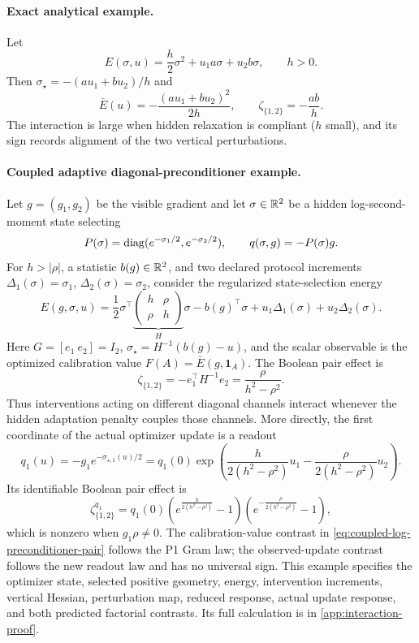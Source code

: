 \paragraph{Exact analytical example.}
Let
\[
E(\sigma,u)=\frac h2\sigma^2+u_1a\sigma+u_2b\sigma,
\qquad h>0.
\]
Then $\sigma_\star=-(au_1+bu_2)/h$ and
\[
\bar E(u)=-\frac{(au_1+bu_2)^2}{2h},
\qquad
\zeta_{\{1,2\}}=-\frac{ab}{h}.
\]
The interaction is large when hidden relaxation is compliant ($h$ small), and its sign records alignment of the two vertical perturbations.

\paragraph{Coupled adaptive diagonal-preconditioner example.}
Let $g=(g_1,g_2)$ be the visible gradient and let $\sigma\in\mathbb R^2$ be a hidden log-second-moment state selecting
\[
P(\sigma)=\operatorname{diag}(e^{-\sigma_1/2},e^{-\sigma_2/2}),
\qquad q(\sigma,g)=-P(\sigma)g.
\]
For $h>|\rho|$, a statistic $b(g)\in\mathbb R^2$, and two declared protocol increments $\Delta_1(\sigma)=\sigma_1$, $\Delta_2(\sigma)=\sigma_2$, consider the regularized state-selection energy
\begin{equation}
E(g,\sigma,u)
=\frac12\sigma^\top
\underbrace{\begin{pmatrix}h&\rho\\ \rho&h\end{pmatrix}}_{H}
\sigma-b(g)^\top\sigma+u_1\Delta_1(\sigma)+u_2\Delta_2(\sigma).
\label{eq:coupled-log-preconditioner}
\end{equation}
Here $G=[e_1\ e_2]=I_2$, $\sigma_\star=H^{-1}(b(g)-u)$, and the scalar observable is the optimized calibration value $F(A)=\bar E(g,\mathbf1_A)$.  The Boolean pair effect is
\begin{equation}
\zeta_{\{1,2\}}
=-e_1^\top H^{-1}e_2
=\frac{\rho}{h^2-\rho^2}.
\label{eq:coupled-log-preconditioner-pair}
\end{equation}
Thus interventions acting on different diagonal channels interact whenever the hidden adaptation penalty couples those channels.  More directly, the first coordinate of the actual optimizer update is a readout
\[
q_1(u)=-g_1e^{-\sigma_{\star,1}(u)/2}
=q_1(0)\exp\!\left(
\frac{h}{2(h^2-\rho^2)}u_1
-\frac{\rho}{2(h^2-\rho^2)}u_2\right).
\]
Its identifiable Boolean pair effect is
\begin{equation}
\zeta^{q_1}_{\{1,2\}}
=q_1(0)
\left(e^{\frac{h}{2(h^2-\rho^2)}}-1\right)
\left(e^{-\frac{\rho}{2(h^2-\rho^2)}}-1\right),
\label{eq:coupled-update-readout-pair}
\end{equation}
which is nonzero when $g_1\rho\ne0$.  The calibration-value contrast in \cref{eq:coupled-log-preconditioner-pair} follows the P1 Gram law; the observed-update contrast follows the new readout law and has no universal sign.  This example specifies the optimizer state, selected positive geometry, energy, intervention increments, vertical Hessian, perturbation map, reduced response, actual update response, and both predicted factorial contrasts.  Its full calculation is in \cref{app:interaction-proof}.

